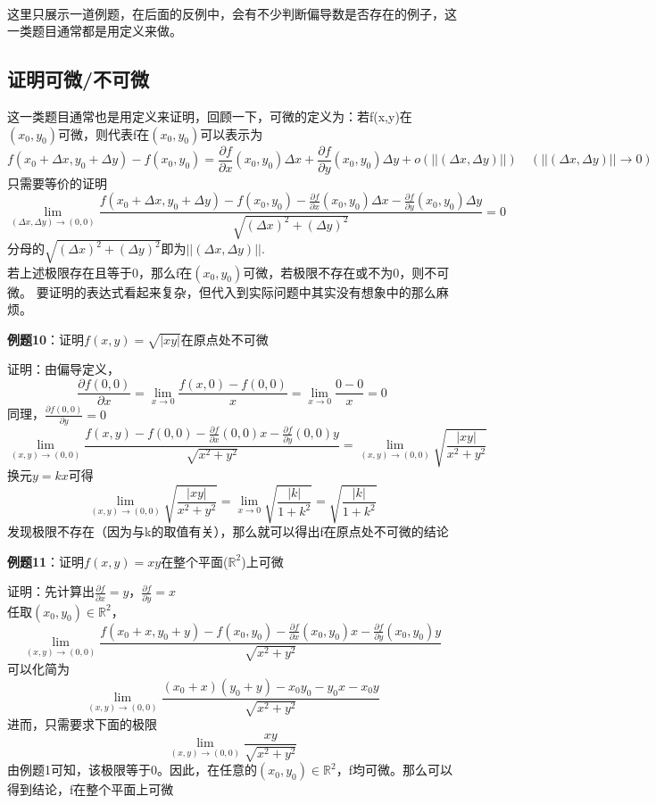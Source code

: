 \documentclass{article}
\begin{document}
~\\

这里只展示一道例题，在后面的反例中，会有不少判断偏导数是否存在的例子，这一类题目通常都是用定义来做。

\subsection{证明可微/不可微}
这一类题目通常也是用定义来证明，回顾一下，可微的定义为：若f(x,y)在$(x_0,y_0)$可微，则代表f在$(x_0,y_0)$可以表示为
\[f(x_0+\Delta x,y_0+\Delta y)-f(x_0,y_0)= \frac{\partial f}{\partial x}(x_0,y_0)\Delta x+\frac{\partial f}{\partial y}(x_0,y_0)\Delta y+o(||(\Delta x,\Delta y)||) \quad (||(\Delta x,\Delta y)|| \rightarrow 0)\]
只需要等价的证明
\[\lim\limits_{(\Delta x,\Delta y) \rightarrow (0,0)} \frac{ f(x_0+\Delta x,y_0+\Delta y)-f(x_0,y_0) - \frac{\partial f}{\partial x}(x_0,y_0)\Delta x - \frac{\partial f}{\partial y}(x_0,y_0)\Delta y}{ \sqrt{(\Delta x)^2+(\Delta y)^2} } = 0\]
分母的$\sqrt{(\Delta x)^2+(\Delta y)^2}$即为$||(\Delta x,\Delta y)||$.\\
若上述极限存在且等于0，那么f在$(x_0,y_0)$可微，若极限不存在或不为0，则不可微。
要证明的表达式看起来复杂，但代入到实际问题中其实没有想象中的那么麻烦。

\textbf{例题10}：证明$f(x,y)=\sqrt{|xy|}$在原点处不可微

证明：由偏导定义，
\[\frac{\partial f(0,0)}{\partial x}=  \lim\limits_{x \rightarrow 0} \frac{f(x,0)-f(0,0)}{x} = \lim\limits_{x \rightarrow 0} \frac{0-0}{x}=0\]
同理，$\frac{\partial f(0,0)}{\partial y}=0$
\[\lim\limits_{(x,y) \rightarrow (0,0)} \frac{ f(x,y)-f(0,0) - \frac{\partial f}{\partial x}(0,0) x - \frac{\partial f}{\partial y}(0,0) y}{ \sqrt{x^2 + y^2} }
=\lim\limits_{(x,y) \rightarrow (0,0)} \sqrt{\frac{|xy|}{x^2+y^2}}\]
换元$y=kx$可得
\[\lim\limits_{(x,y) \rightarrow (0,0)} \sqrt{\frac{|xy|}{x^2+y^2}}=\lim\limits_{x \rightarrow 0} \sqrt{\frac{|k|}{1+k^2}}=\sqrt{\frac{|k|}{1+k^2}}\]
发现极限不存在（因为与k的取值有关），那么就可以得出f在原点处不可微的结论


\textbf{例题11}：证明$f(x,y)=xy$在整个平面($\mathbb{R}^2$)上可微

证明：先计算出$\frac{\partial f}{\partial x} = y$，$\frac{\partial f}{\partial y} = x$\\
任取$(x_0,y_0) \in \mathbb{R}^2$，
\[\lim\limits_{(x,y) \rightarrow (0,0)} \frac{ f(x_0+x,y_0+y)-f(x_0,y_0) - \frac{\partial f}{\partial x}(x_0,y_0) x - \frac{\partial f}{\partial y}(x_0,y_0) y}{ \sqrt{x^2 + y^2} }\]
可以化简为
\[\lim\limits_{(x,y) \rightarrow (0,0)} \frac{ (x_0+x)(y_0+y)-x_0y_0 - y_0 x - x_0 y}{ \sqrt{x^2 + y^2} }\]
进而，只需要求下面的极限
\[\lim\limits_{(x,y) \rightarrow (0,0)} \frac{xy}{ \sqrt{x^2 + y^2} }\]
由例题1可知，该极限等于0。因此，在任意的$(x_0,y_0) \in \mathbb{R}^2$，f均可微。那么可以得到结论，f在整个平面上可微
\end{document}
